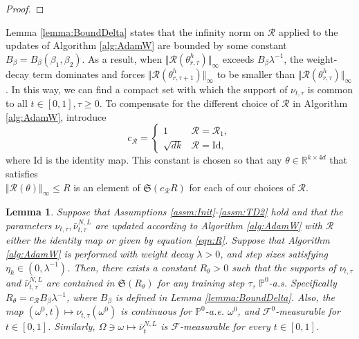 \documentclass{article}
\newtheorem{lemma}[theorem]{Lemma}
\newcommand{\R}{\mathbb{R}}
\begin{document}
\begin{appendices}
\begin{proof}
\end{proof}

 Lemma \ref{lemma:BoundDelta} states that the infinity norm on $\mathcal R$ applied to the updates of Algorithm \ref{alg:AdamW} are bounded by some constant $B_\beta=B_\beta(\beta_1,\beta_2)$. As a result, when $\Vert \mathcal R(\theta^h_{r,\tau})\Vert_\infty$ exceeds $B_\beta\lambda^{-1}$, the weight-decay term dominates and forces $\Vert \mathcal R(\theta^{h}_{r,\tau+1})\Vert_\infty$ to be smaller than $\Vert \mathcal R(\theta^{h}_{r,\tau})\Vert_\infty$. In this way, we can find a compact set with which the support of $\nu_{t,\tau}$ is common to all $t\in[0,1], \tau\ge 0$. To compensate for the different choice of $\mathcal R$ in Algorithm \ref{alg:AdamW}, introduce
\[
c_\mathcal R=\begin{cases}1 &\mathcal R=\mathcal R_1,\\
\sqrt{dk} &\mathcal R=\mathrm{Id},
\end{cases}
\]
where $\mathrm{Id}$ is the identity map. This constant is chosen so that any $\theta \in \R^{k\times 4d}$ that satisfies \\$\Vert \mathcal R(\theta)\Vert_\infty\le R$ is an element of $\mathfrak{S}(c_\mathcal RR)$ for each of our choices of $\mathcal R$.
\begin{lemma}\label{lemma:GlobalWellDefined}
Suppose that Assumptions \ref{assm:Init}-\ref{assm:TD2} hold and that the parameters $\nu_{t,\tau},\bar\nu^{N,L}_{t,\tau}$ are updated according to Algorithm \ref{alg:AdamW} with $\mathcal R$ either the identity map or given by equation \eqref{eqn:R}. Suppose that Algorithm \ref{alg:AdamW} is performed with weight decay $\lambda>0$, and step sizes satisfying $\eta_k \in (0,\lambda^{-1})$. Then, there exists a constant $R_\theta>0$ such that the supports of $\nu_{t,\tau}$ and $\bar\nu^{N,L}_{t,\tau}$  are contained in $\mathfrak{S}(R_\theta)$ for any training step $\tau$, $\mathbb P^0$-a.s. Specifically $R_\theta=c_\mathcal{R} B_\beta\lambda^{-1}$, where $B_\beta$ is defined in Lemma \ref{lemma:BoundDelta}. Also, the map $(\omega^0,t)\mapsto\nu_{t,\tau}(\omega^0)$ is continuous for $\mathbb P^0$-a.e. $\omega^0$, and $\mathcal F^0$-measurable for $t\in[0,1]$. Similarly, $\Omega\ni\omega\mapsto \bar \nu^{N,L}_{t}$ is $\mathcal F$-measurable for every $t\in[0,1]$.


\end{lemma}
\end{appendices}
\end{document}
